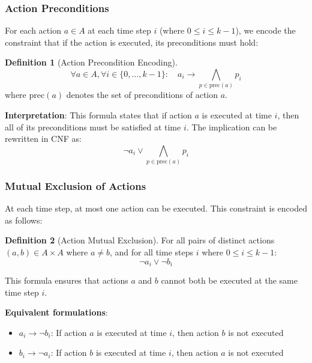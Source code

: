 \documentclass[11pt,a4paper]{article}
\theoremstyle{definition}
\newtheorem{definition}{Definition}[section]
\theoremstyle{plain}
\theoremstyle{remark}
\begin{document}
\subsubsection{Action Preconditions}

For each action $a \in A$ at each time step $i$ (where $0 \leq i \leq k-1$), we encode the constraint that if the action is executed, its preconditions must hold:

\begin{tcolorbox}[colback=yellow!10!white,colframe=yellow!75!black,title=\textbf{Action Precondition Encoding}]
\begin{definition}[Action Precondition Encoding]
\[
\forall a \in A, \forall i \in \{0, \dots, k-1\}: \quad a_i \rightarrow \bigwedge_{p \in \text{prec}(a)} p_i
\]
where $\text{prec}(a)$ denotes the set of preconditions of action $a$.
\end{definition}
\end{tcolorbox}

\textbf{Interpretation}: This formula states that if action $a$ is executed at time $i$, then all of its preconditions must be satisfied at time $i$. The implication can be rewritten in CNF as:
\[
\neg a_i \lor \bigwedge_{p \in \text{prec}(a)} p_i
\]

\subsubsection{Mutual Exclusion of Actions}

At each time step, at most one action can be executed. This constraint is encoded as follows:

\begin{tcolorbox}[colback=orange!10!white,colframe=orange!75!black,title=\textbf{Action Mutual Exclusion}]
\begin{definition}[Action Mutual Exclusion]
For all pairs of distinct actions \( (a, b) \in A \times A \) where \( a \neq b \), and for all time steps \( i \) where \( 0 \leq i \leq k-1 \):
\[
\neg a_i \lor \neg b_i
\]
\end{definition}
\end{tcolorbox}

This formula ensures that actions \( a \) and \( b \) cannot both be executed at the same time step \( i \).

\textbf{Equivalent formulations}:
\begin{itemize}
    \item \( a_i \rightarrow \neg b_i \): If action \( a \) is executed at time \( i \), then action \( b \) is not executed
    \item \( b_i \rightarrow \neg a_i \): If action \( b \) is executed at time \( i \), then action \( a \) is not executed
\end{itemize}
\end{document}
